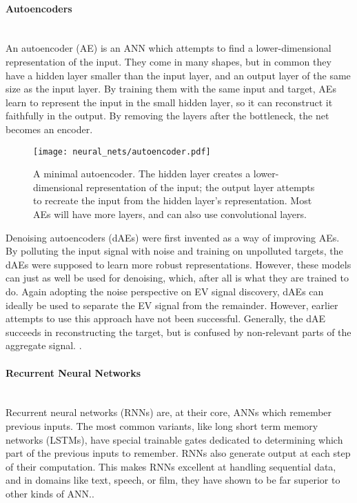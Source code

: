 \documentclass[12pt, american]{article}
\begin{document}
\paragraph{Autoencoders}\mbox{}\\

\noindent An autoencoder (AE) is an ANN which attempts to find a lower-dimensional representation of the input. They come in many shapes, but in common they have a hidden layer smaller than the input layer, and an output layer of the same size as the input layer. By training them with the same input and target, AEs learn to represent the input in the small hidden layer, so it can reconstruct it faithfully in the output. By removing the layers after the bottleneck, the net becomes an encoder.

\begin{figure}[h]
\centering
\caption{A minimal autoencoder. The hidden layer creates a lower-dimensional representation of the input; the output layer attempts to recreate the input from the hidden layer's representation. Most AEs will have more layers, and can also use convolutional layers.}
\texttt{[image: neural\_nets/autoencoder.pdf]}
\label{fig:autoencoder}
\end{figure}

Denoising autoencoders (dAEs) were first invented as a way of improving AEs. By polluting the input signal with noise and training on unpolluted targets, the dAEs were supposed to learn more robust representations. However, these models can just as well be used for denoising, which, after all is what they are trained to do. Again adopting the noise perspective on EV signal discovery, dAEs can ideally be used to separate the EV signal from the remainder. However, earlier attempts to use this approach have not been successful. Generally, the dAE succeeds in reconstructing the target, but is confused by non-relevant parts of the aggregate signal. \cite{Kelly2015c}.

\paragraph{Recurrent Neural Networks}\mbox{}\\

\noindent 
Recurrent neural networks (RNNs) are, at their core, ANNs which remember previous inputs. The most common variants, like long short term memory networks (LSTMs), have special trainable gates dedicated to determining which part of the previous inputs to remember. RNNs also generate output at each step of their computation. This makes RNNs excellent at handling sequential data, and in domains like text, speech, or film, they have shown to be far superior to other kinds of ANN.\cite{Lecun2015}.
\end{document}
